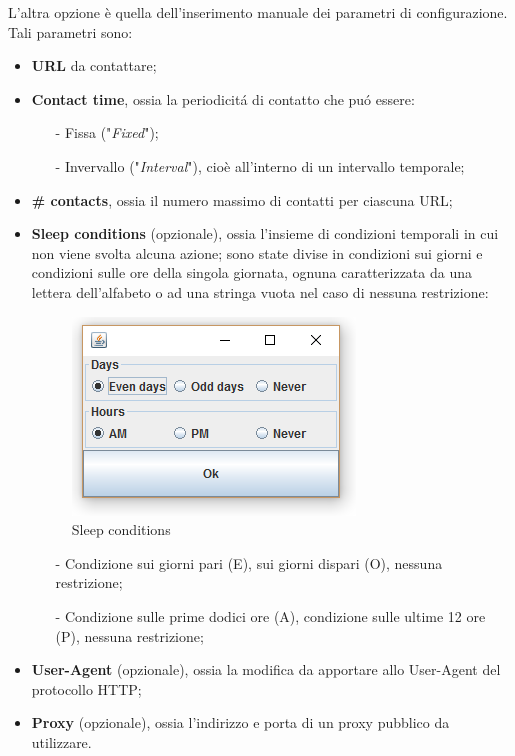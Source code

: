 \newpage
L'altra opzione \`e quella dell'inserimento manuale dei parametri di configurazione.\\
Tali parametri sono:
\begin{itemize} 
\item \textbf{URL} da contattare;
\item \textbf{Contact time}, ossia la periodicit\'a di contatto che pu\'o essere:
\begin{itemize}
\item [-] Fissa ("\textit{Fixed}");
\item [-] Invervallo ("\textit{Interval}"), cio\`e all'interno di un intervallo temporale;
\end{itemize} 
\item \textbf{\# contacts}, ossia il numero massimo di contatti per ciascuna URL;
\item \textbf{Sleep conditions} (opzionale), ossia l'insieme di condizioni temporali in cui non viene svolta alcuna azione; sono state divise in condizioni sui giorni e condizioni sulle ore della singola giornata, ognuna caratterizzata da una lettera dell'alfabeto o ad una stringa vuota nel caso di nessuna restrizione:
\begin{figure}[!htb]
        \centering
		\includegraphics[width=0.4\linewidth]{./imgs/sleep}
        \caption{Sleep conditions}
\end{figure}
\begin{itemize}
\item [-] Condizione sui giorni pari (E), sui giorni dispari (O), nessuna restrizione;
\item [-] Condizione sulle prime dodici ore (A), condizione sulle ultime 12 ore (P), nessuna restrizione;
\end{itemize}
\item \textbf{User-Agent} (opzionale), ossia la modifica da apportare allo User-Agent del protocollo HTTP;
\item \textbf{Proxy} (opzionale), ossia l'indirizzo e porta di un proxy pubblico da utilizzare.
\end{itemize} 

